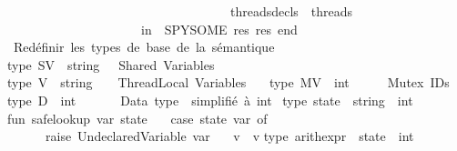 \begin{isabellebody}
\ \ \ \ \ \ \ \ \ \ \ \ \ \ \ \ \ \ \ \ \ \ \ \ \ \ \ \ \ \ \ \ \ \ \ threads{\isacharunderscore}{\kern0pt}decls\ {\isacharequal}{\kern0pt}\ threads{\isacharprime}{\kern0pt}{\isacharbraceright}{\kern0pt}\isanewline
\ \ \ \ \ \ \ \ \ \ \ \ \ \ \ \ \ \ \ \ \ in\ \ SPY{\isacharcolon}{\kern0pt}{\isacharequal}{\kern0pt}{\isacharparenleft}{\kern0pt}SOME\ {\isacharparenleft}{\kern0pt}res{\isacharparenright}{\kern0pt}{\isacharparenright}{\kern0pt}{\isacharsemicolon}{\kern0pt}\ res\ end\isanewline
\isanewline
\isanewline
{\isacartoucheclose}%
\endisatagML
{\isafoldML}%
%
\isadelimML
%
\endisadelimML
%
\isadelimdocument
%
\endisadelimdocument
%
\isatagdocument
%
\isamarkuptrue%
%
\endisatagdocument
{\isafolddocument}%
%
\isadelimdocument
%
\endisadelimdocument
%
\isadelimML
%
\endisadelimML
%
\isatagML
{}\isamarkupfalse%
{\isacartoucheopen}\isanewline
{\isacharparenleft}{\kern0pt}{\isacharasterisk}{\kern0pt}\ Redéfinir\ les\ types\ de\ base\ de\ la\ sémantique\ {\isacharasterisk}{\kern0pt}{\isacharparenright}{\kern0pt}\isanewline
type\ SV\ {\isacharequal}{\kern0pt}\ string\ \ {\isacharparenleft}{\kern0pt}{\isacharasterisk}{\kern0pt}\ Shared\ Variables\ {\isacharasterisk}{\kern0pt}{\isacharparenright}{\kern0pt}\isanewline
type\ V\ {\isacharequal}{\kern0pt}\ string\ \ \ {\isacharparenleft}{\kern0pt}{\isacharasterisk}{\kern0pt}\ Thread{\isacharminus}{\kern0pt}Local\ Variables\ {\isacharasterisk}{\kern0pt}{\isacharparenright}{\kern0pt}\ \ \isanewline
type\ MV\ {\isacharequal}{\kern0pt}\ int\ \ \ \ \ {\isacharparenleft}{\kern0pt}{\isacharasterisk}{\kern0pt}\ Mutex\ IDs\ {\isacharasterisk}{\kern0pt}{\isacharparenright}{\kern0pt}\isanewline
type\ D\ {\isacharequal}{\kern0pt}\ int\ \ \ \ \ \ {\isacharparenleft}{\kern0pt}{\isacharasterisk}{\kern0pt}\ Data\ type\ {\isacharminus}{\kern0pt}\ simplifié\ à\ int\ {\isacharasterisk}{\kern0pt}{\isacharparenright}{\kern0pt}\isanewline
\isanewline
type\ state\ {\isacharequal}{\kern0pt}\ string\ {\isacharminus}{\kern0pt}{\isachargreater}{\kern0pt}\ int\isanewline
\isanewline
fun\ safe{\isacharunderscore}{\kern0pt}lookup\ var\ state\ {\isacharequal}{\kern0pt}\isanewline
\ \ case\ state\ var\ of\isanewline
\ \ \ \ {\isachartilde}{\kern0pt}{}\ {\isacharequal}{\kern0pt}{\isachargreater}{\kern0pt}\ raise\ Undeclared{\isacharunderscore}{\kern0pt}Variable\ var\isanewline
\ \ {\isacharbar}{\kern0pt}\ v\ {\isacharequal}{\kern0pt}{\isachargreater}{\kern0pt}\ v\isanewline
\isanewline
type\ arith{\isacharunderscore}{\kern0pt}expr\ {\isacharequal}{\kern0pt}\ state\ {\isacharminus}{\kern0pt}{\isachargreater}{\kern0pt}\ int\isanewline

\end{isabellebody}
